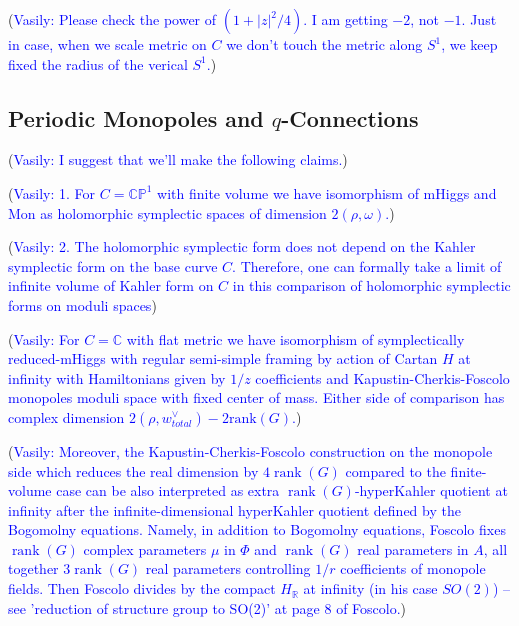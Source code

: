 \documentclass[11pt, oneside, reqno]{amsart}
\theoremstyle{definition} \newtheorem{definition}{Definition}[section]
\theoremstyle{definition} \newtheorem{remark}[definition]{Remark}
\theoremstyle{definition} \newtheorem{remarks}[definition]{Remarks}
\theoremstyle{definition} \newtheorem{question}[definition]{Question}
\theoremstyle{definition} \newtheorem*{note}{Note}
\theoremstyle{definition} \newtheorem{example}[definition]{Example}
\theoremstyle{definition} \newtheorem{examples}[definition]{Examples}
\DeclareMathOperator{\rank}{rank}
\newcommand{\vasily}[1]{(\textcolor{blue}{Vasily: #1})}
\begin{document}
\vasily{Please check the power of $(1+|z|^2/4)$. I am getting $-2$, not $-1$. Just in case,
  when we scale metric on $C$ we don't touch the metric along $S^1$, we keep fixed the radius of the verical $S^1$.}

\subsection{Periodic Monopoles and $q$-Connections}

\vasily{I suggest that we'll make the following claims.}

\vasily{
  1. For $C = \mathbb{CP}^{1}$ with finite volume we have isomorphism
  of mHiggs and Mon as holomorphic symplectic spaces of dimension $2 (\rho ,\omega)$.}

\vasily{
  2. The holomorphic symplectic form does not depend on the Kahler
  symplectic form on the base curve $C$. Therefore, one can formally take
  a limit of infinite volume of Kahler form on $C$ in this comparison of holomorphic symplectic forms on moduli spaces}


\vasily{ For $C = \mathbb{C}$ with flat metric we have isomorphism of
  symplectically reduced-mHiggs with regular semi-simple framing by
  action of Cartan $H$ at infinity with Hamiltonians given by $1/z$
  coefficients and Kapustin-Cherkis-Foscolo monopoles moduli space
  with fixed center of mass. Either
  side of comparison has complex dimension $2(\rho, w_{total}^{\vee}) - 2 \mathrm{rank}(G)$.}

\vasily{  Moreover, the Kapustin-Cherkis-Foscolo construction
  on the monopole side which reduces the real dimension
  by $4 \rank(G)$ compared to the finite-volume case
  can be also interpreted as extra $\rank(G)$-hyperKahler quotient
  at infinity after the infinite-dimensional hyperKahler quotient defined
  by the Bogomolny equations. 
  Namely, in addition to Bogomolny equations, Foscolo fixes $\rank(G)$ complex parameters $\mu$ in $\Phi$
  and $\rank(G)$ real parameters in $A$, all together $3 \rank(G)$
  real parameters controlling $1/r$ coefficients of monopole fields.
  Then Foscolo divides by the compact $H_{\mathbb{R}}$ at infinity (in his
  case $SO(2)$)  -- see 'reduction of structure group to SO(2)' at page 8 of Foscolo.}
\end{document}
